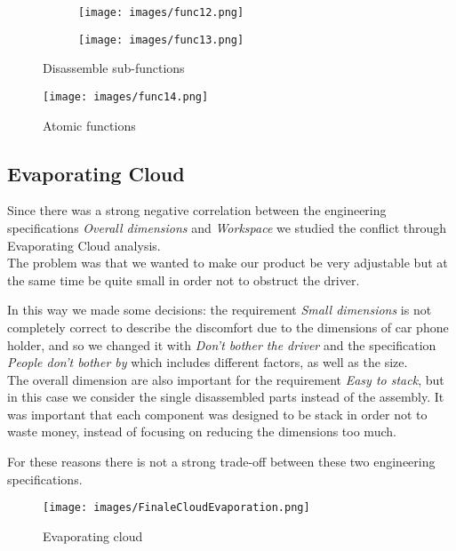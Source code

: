 \documentclass[11pt,a4paper]{article}
\begin{document}
		\begin{figure}[H]
			\begin{subfigure}[b]{0.5\textwidth}
				\centering
				\texttt{[image: images/func12.png]}
			\end{subfigure}
			\hfill
			\begin{subfigure}[b]{0.5\textwidth}
				\centering
				\texttt{[image: images/func13.png]}
			\end{subfigure}
			\caption{Disassemble sub-functions}
			\label{Disassemble sub-functions}	
		\end{figure}
	
		\begin{figure}[H]
			\centering
			\texttt{[image: images/func14.png]}
			\caption{Atomic functions}
			\label{Atomic functions}
		\end{figure}
	
	\subsection{Evaporating Cloud}
		Since there was a strong negative correlation between the engineering specifications \emph{Overall dimensions} and \emph{Workspace} we studied the conflict through Evaporating Cloud analysis. \\
		The problem was that we wanted to make our product be very adjustable but at the same time be quite small in order not to obstruct the driver. 
		
		\smallskip
		
		In this way we made some decisions: the requirement \emph{Small dimensions} is not completely correct to describe the discomfort due to the dimensions of car phone holder, and so we changed it with \emph{Don't bother the driver} and the specification \emph{People don't bother by} which includes different factors, as well as the size. \\
		The overall dimension are also important for the requirement \emph{Easy to stack}, but in this case we consider the single disassembled parts instead of the assembly. It was important that each component was designed to be stack in order not to waste money, instead of focusing on reducing the dimensions too much. 
		
		\smallskip
		
		For these reasons there is not a strong trade-off between these two engineering specifications. 
		\begin{figure}[H]
			\centering
			\texttt{[image: images/FinaleCloudEvaporation.png]}
			\caption{Evaporating cloud}
			\label{Evaporating cloud}
		\end{figure}
	
\end{document}
